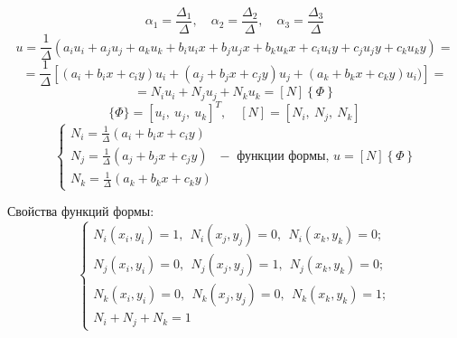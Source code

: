 \documentclass{bmstu}
\begin{document}
	\[
	\alpha_1 = \frac{\Delta_1}{\Delta}, \quad \alpha_2 = \frac{\Delta_2}{\Delta}, \quad \alpha_3 = \frac{\Delta_3}{\Delta}
	\]
	\[
	u=\frac{1}{\Delta}(a_iu_i+a_ju_j+a_ku_k+b_iu_ix+b_ju_jx+b_ku_kx+c_iu_iy+c_ju_jy+c_ku_ky)=
	\]
	\[
	=\frac{1}{\Delta}\left[(a_i+b_ix+c_iy)u_i+(a_j+b_jx+c_jy)u_j+(a_k+b_kx+c_ky)u_i)\right]=
	\]
	\[
	=N_iu_i+N_ju_j+N_ku_k=\left[N\right]\left\{\Phi\right\}
	\]
	\[\{\Phi\} = [u_i, \ u_j,\ u_k]^T,\quad [N] = [N_i, \ N_j,\ N_k]\]
	\[
	\begin{cases}
		N_i = \frac{1}{\Delta}(a_i+b_ix+c_iy) \\
		N_j = \frac{1}{\Delta}(a_j+b_jx+c_jy) \\
		N_k = \frac{1}{\Delta}(a_k+b_kx+c_ky) 
	\end{cases} - \text{ функции формы, } u=\left[N\right]\left\{\Phi\right\}
	\]
	
	Свойства функций формы:
	\[\begin{cases}
	N_i(x_i, y_i) = 1,\ \ N_i(x_j, y_j) = 0,\ \ N_i(x_k, y_k) = 0;\\
	N_j(x_i, y_i) = 0,\ \ N_j(x_j, y_j) = 1,\ \ N_j(x_k, y_k) = 0;\\
	N_k(x_i, y_i) = 0,\ \ N_k(x_j, y_j) = 0,\ \ N_k(x_k, y_k) = 1;\\
	N_i + N_j + N_k = 1
	\end{cases}\]
	
\end{document}
